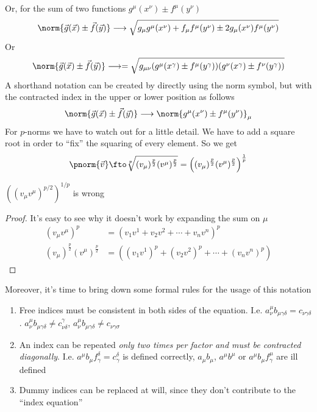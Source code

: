 \documentclass[../mmf.tex]{subfiles}
\begin{document}
Or, for the sum of two functions $g^\mu(x^\nu)\pm f^\mu(y^\nu)$
\begin{equation}
	\norm{\vec{g}(\vec{x})\pm\vec{f}(\vec{y})}\longrightarrow\sqrt{g_\mu g^\mu(x^\nu)+f_\mu f^\mu(y^\nu)\pm2g_\mu(x^\nu)f^\mu(y^\nu)}	\label{eq:funcsumein}
\end{equation}
Or
\begin{equation*}
	\norm{\vec{g}(\vec{x})\pm\vec{f}(\vec{y})}\longrightarrow=\sqrt{g_{\mu\nu}(g^\mu(x^\gamma)\pm f^\mu(y^\gamma))(g^\nu(x^\gamma)\pm f^\nu(y^\gamma))}
\end{equation*}
A shorthand notation can be created by directly using the norm symbol, but with the contracted index in the upper or lower position as follows
\begin{equation}
	\norm{\vec{g}(\vec{x})\pm\vec{f}(\vec{y})}\longrightarrow\norm{g^\mu(x^\nu)\pm f^\mu(y^\nu)}_\mu
	\label{eq:normindex}
\end{equation}
For $p$-norms we have to watch out for a little detail. We have to add a square root in order to ``fix'' the squaring of every element. So we get
\begin{equation}
	\pnorm{\vec{v}}\fto\sqrt[p]{(v_\mu)^{\frac{p}{2}} (v^\mu)^{\frac{p}{2}}}=\left( (v_\mu)^{\frac{p}{2}}(v^\mu)^{\frac{p}{2}} \right)^{\frac{1}{p}}
	\label{eq:pnormein}
\end{equation}
\begin{thm}
	$\left( (v_\mu v^\mu)^{p/2} \right)^{1/p}$ is wrong
\end{thm}
\begin{proof}
	It's easy to see why it doesn't work by expanding the sum on $\mu$
	\begin{equation}
		\begin{aligned}
			(v_\mu v^\mu)^p&=\left( v_1v^1+v_2v^2+\cdots+v_nv^n \right)^p\\
			(v_\mu)^{\frac{p}{2}}(v^\mu)^{\frac{p}{2}}&=\left( (v_1v^1)^{p}+(v_2v^2)^p+\cdots+(v_nv^n)^p \right)
		\end{aligned}
		\label{eq:pnormproof}
	\end{equation}
\end{proof}
Moreover, it's time to bring down some formal rules for the usage of this notation
\begin{thm}
	\begin{enumerate}
	\item Free indices must be consistent in both sides of the equation. I.e. $a^\mu_\nu b_{\mu\gamma\delta}=c_{\nu\gamma\delta}$. $a^\mu_\nu b_{\mu\gamma\delta}\ne c^\gamma_{\nu\delta}$, $a^\mu_\nu b_{\mu\gamma\delta}\ne c_{\nu\gamma\sigma}$
	\item An index can be repeated \emph{only two times per factor and must be contracted diagonally}. I.e. $a^\mu b_\mu f^\delta_\gamma=c^\delta_\gamma$ is defined correctly, $a_\mu b_\mu$, $a^\mu b^\mu$ or $a^\mu b_\mu f^\mu_\gamma$ are ill defined
	\item Dummy indices can be replaced at will, since they don't contribute to the ``index equation''
	\end{enumerate}
\end{thm}
\end{document}
